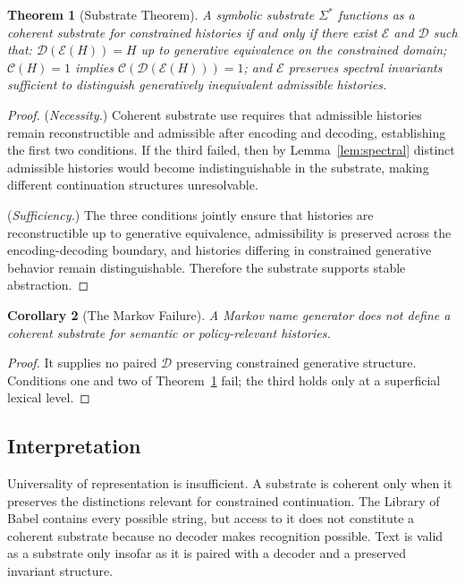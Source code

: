 \documentclass[12pt, a4paper]{article}
\theoremstyle{plain}
\newtheorem{theorem}{Theorem}[section]
\newtheorem{corollary}[theorem]{Corollary}
\theoremstyle{definition}
\theoremstyle{remark}
\begin{document}
\begin{theorem}[Substrate Theorem]
\label{thm:substrate}
A symbolic substrate $\Sigma^*$ functions as a coherent substrate for constrained histories if and only if there exist $\mathcal{E}$ and $\mathcal{D}$ such that: $\mathcal{D}(\mathcal{E}(H)) = H$ up to generative equivalence on the constrained domain; $\mathcal{C}(H) = 1$ implies $\mathcal{C}(\mathcal{D}(\mathcal{E}(H))) = 1$; and $\mathcal{E}$ preserves spectral invariants sufficient to distinguish generatively inequivalent admissible histories.
\end{theorem}

\begin{proof}
(\textit{Necessity.}) Coherent substrate use requires that admissible histories remain reconstructible and admissible after encoding and decoding, establishing the first two conditions. If the third failed, then by Lemma~\ref{lem:spectral} distinct admissible histories would become indistinguishable in the substrate, making different continuation structures unresolvable.

(\textit{Sufficiency.}) The three conditions jointly ensure that histories are reconstructible up to generative equivalence, admissibility is preserved across the encoding-decoding boundary, and histories differing in constrained generative behavior remain distinguishable. Therefore the substrate supports stable abstraction.
\end{proof}

\begin{corollary}[The Markov Failure]
A Markov name generator does not define a coherent substrate for semantic or policy-relevant histories.
\end{corollary}

\begin{proof}
It supplies no paired $\mathcal{D}$ preserving constrained generative structure. Conditions one and two of Theorem~\ref{thm:substrate} fail; the third holds only at a superficial lexical level.
\end{proof}

\subsection{Interpretation}

Universality of representation is insufficient. A substrate is coherent only when it preserves the distinctions relevant for constrained continuation. The Library of Babel contains every possible string, but access to it does not constitute a coherent substrate because no decoder makes recognition possible. Text is valid as a substrate only insofar as it is paired with a decoder and a preserved invariant structure.
\end{document}
